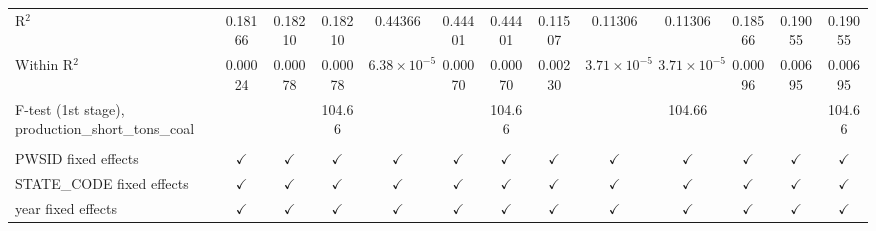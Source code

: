 \begin{table}[htbp]
\begin{adjustbox}{width = \textwidth, center}
\begin{tabular}{lcccccccccccc}
         R$^2$                                                & 0.18166               & 0.18210       & 0.18210               & 0.44366               & 0.44401       & 0.44401               & 0.11507                & 0.11306               & 0.11306                & 0.18566               & 0.19055         & 0.19055\\  
         Within R$^2$                                         & 0.00024               & 0.00078       & 0.00078               & $6.38\times 10^{-5}$  & 0.00070       & 0.00070               & 0.00230                & $3.71\times 10^{-5}$  & $3.71\times 10^{-5}$   & 0.00096               & 0.00695         & 0.00695\\  
         F-test (1st stage), production\_short\_tons\_coal    &                       &               & 104.66                &                       &               & 104.66                &                        &                       & 104.66                 &                       &                 & 104.66\\  
          \\
         PWSID fixed effects                                  & $\checkmark$          & $\checkmark$  & $\checkmark$          & $\checkmark$          & $\checkmark$  & $\checkmark$          & $\checkmark$           & $\checkmark$          & $\checkmark$           & $\checkmark$          & $\checkmark$    & $\checkmark$\\   
         STATE\_CODE fixed effects                            & $\checkmark$          & $\checkmark$  & $\checkmark$          & $\checkmark$          & $\checkmark$  & $\checkmark$          & $\checkmark$           & $\checkmark$          & $\checkmark$           & $\checkmark$          & $\checkmark$    & $\checkmark$\\   
         year fixed effects                                   & $\checkmark$          & $\checkmark$  & $\checkmark$          & $\checkmark$          & $\checkmark$  & $\checkmark$          & $\checkmark$           & $\checkmark$          & $\checkmark$           & $\checkmark$          & $\checkmark$    & $\checkmark$\\   
         \bottomrule
      \end{tabular}
   \end{adjustbox}
\end{table}


